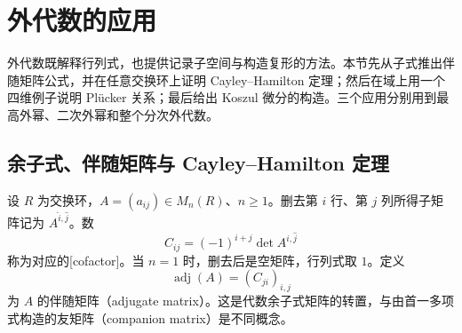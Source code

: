 
\section{外代数的应用}
\label{b2:sec:0904}

外代数既解释行列式，也提供记录子空间与构造复形的方法。本节先从子式推出伴随矩阵公式，并在任意交换环上证明 Cayley–Hamilton 定理；然后在域上用一个四维例子说明 Plücker 关系；最后给出 Koszul 微分的构造。三个应用分别用到最高外幂、二次外幂和整个分次外代数。

%
%
%

\subsection{余子式、伴随矩阵与 Cayley–Hamilton 定理}
\label{b2:subsec:0904:01}

设 \(R\) 为交换环，\(A=(a_{ij})\in M_n(R)\)、\(n\ge1\)。删去第 \(i\) 行、第 \(j\) 列所得子矩阵记为 \(A^{\widehat i,\widehat j}\)。数
\[
	C_{ij}=(-1)^{i+j}\det A^{\widehat i,\widehat j}
\]
称为对应的[cofactor]。当 \(n=1\) 时，删去后是空矩阵，行列式取 \(1\)。定义
\[
	\operatorname{adj}(A)=(C_{ji})_{i,j}
\]
为 \(A\) 的伴随矩阵（adjugate matrix）。这是代数余子式矩阵的转置，与由首一多项式构造的友矩阵（companion matrix）是不同概念。

